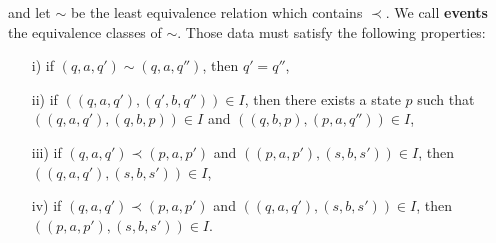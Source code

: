 \noindent and let $\sim$ be the least equivalence relation which contains $\prec$. We call \textbf{events} the equivalence classes of $\sim$. Those data must satisfy the following properties:
		\begin{itemize}
			\item[i)] if $(q,a,q') \sim (q,a,q'')$, then $q' = q''$,
			\item[ii)] if $((q,a,q'),(q',b,q''))\in I$, then there exists a state $p$ such that $((q,a,q'),(q,b,p)) \in I$ and $((q,b,p),(p,a,q'')) \in I$,
			
				\begin{figure}[H]
					\begin{center}
    						
  					\end{center}
				\end{figure}
			
			\item[iii)] if $(q,a,q') \prec (p,a,p')$ and $((p,a,p'),(s,b,s')) \in I$, then $((q,a,q'),(s,b,s')) \in I$,
			\item[iv)] if $(q,a,q') \prec (p,a,p')$ and $((q,a,q'),(s,b,s')) \in I$, then $((p,a,p'),(s,b,s')) \in I$.
		\end{itemize}

